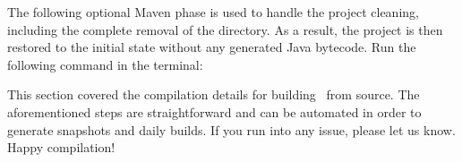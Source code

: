 The following optional Maven phase is used to handle the project cleaning, including the complete removal of the  directory. As a result, the project is then restored to the initial state without any generated Java bytecode. Run the following command in the terminal:


This section covered the compilation details for building \arara\ from source. The aforementioned steps are straightforward and can be automated in order to generate snapshots and daily builds. If you run into any issue, please let us know. Happy compilation!
